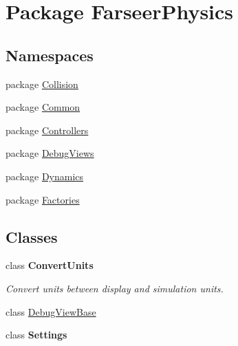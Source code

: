 \hypertarget{namespace_farseer_physics}{\section{Package Farseer\+Physics}
\label{namespace_farseer_physics}
}
\subsection*{Namespaces}
\begin{DoxyCompactItemize}
\item 
package \hyperlink{namespace_farseer_physics_1_1_collision}{Collision}
\item 
package \hyperlink{namespace_farseer_physics_1_1_common}{Common}
\item 
package \hyperlink{namespace_farseer_physics_1_1_controllers}{Controllers}
\item 
package \hyperlink{namespace_farseer_physics_1_1_debug_views}{Debug\+Views}
\item 
package \hyperlink{namespace_farseer_physics_1_1_dynamics}{Dynamics}
\item 
package \hyperlink{namespace_farseer_physics_1_1_factories}{Factories}
\end{DoxyCompactItemize}
\subsection*{Classes}
\begin{DoxyCompactItemize}
\item 
class {\bfseries Convert\+Units}
\begin{DoxyCompactList}\small\item\em Convert units between display and simulation units. \end{DoxyCompactList}\item 
class \hyperlink{class_farseer_physics_1_1_debug_view_base}{Debug\+View\+Base}
\item 
class {\bfseries Settings}
\end{DoxyCompactItemize}
